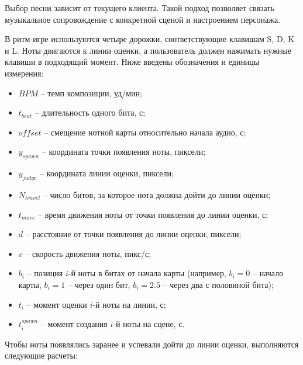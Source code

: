 \documentclass[utf8, russian]{eskdtext}
\numberwithin{equation}{section}
\begin{document}
Выбор песни зависит от текущего клиента. Такой подход позволяет связать музыкальное сопровождение с конкретной сценой и настроением персонажа.

В ритм-игре используются четыре дорожки, соответствующие клавишам S, D, K и L. Ноты двигаются к линии оценки, а пользователь должен нажимать нужные клавиши в подходящий момент. Ниже введены обозначения и единицы измерения:

\begin{itemize}
    \item $BPM$ -- темп композиции, уд/мин;
    \item $t_{beat}$ -- длительность одного бита, с;
    \item $offset$ -- смещение нотной карты относительно начала аудио, с;
    \item $y_{spawn}$ -- координата точки появления ноты, пиксели;
    \item $y_{judge}$ -- координата линии оценки, пиксели;
    \item $N_{travel}$ -- число битов, за которое нота должна дойти до линии оценки;
    \item $t_{move}$ -- время движения ноты от точки появления до линии оценки, с;
    \item $d$ -- расстояние от точки появления до линии оценки, пиксели;
    \item $v$ -- скорость движения ноты, пикс/с;
    \item $b_i$ -- позиция $i$-й ноты в битах от начала карты (например, $b_i=0$ -- начало карты, $b_i=1$ -- через один бит, $b_i=2.5$ -- через два с половиной бита);
    \item $t_i$ -- момент оценки $i$-й ноты на линии, с;
    \item $t^{spawn}_i$ -- момент создания $i$-й ноты на сцене, с.
\end{itemize}

Чтобы ноты появлялись заранее и успевали дойти до линии оценки, выполняются следующие расчеты:
\end{document}
